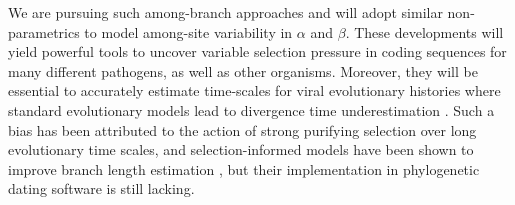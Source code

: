 We are pursuing such among-branch approaches and will adopt similar non-parametrics to model among-site variability in $\alpha$ and $\beta$. 
These developments will yield powerful tools to uncover variable selection pressure in coding sequences for many different pathogens, as well as other organisms.
Moreover, they will be essential to accurately estimate time-scales for viral evolutionary histories where standard evolutionary models lead to divergence time underestimation \citep{Wertheim2011}. 
Such a bias has been attributed to the action of strong purifying selection over long evolutionary time scales, and selection-informed models have been shown to improve branch length estimation \citep{Wertheim2011}, but their implementation in phylogenetic dating software is still lacking.




